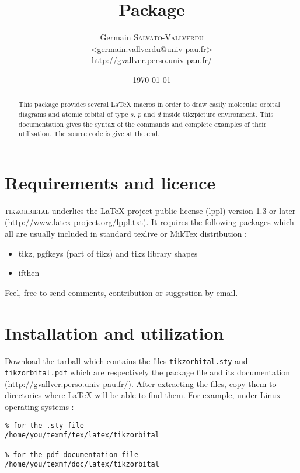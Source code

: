 \documentclass[10pt]{article}
\title{\package Package}
\author{Germain \textsc{Salvato-Vallverdu} \\ \url{<germain.vallverdu@univ-pau.fr>}\\\url{http://gvallver.perso.univ-pau.fr/}}
\date{\today}
\newcommand{\package}{\textsc{\sffamily\color{blue!50!black}tikzorbiltal}\xspace}
\begin{document}

\maketitle

\begin{abstract}
    This package provides several \LaTeX{} macros in order to draw easily molecular orbital diagrams and atomic orbital of type $s$, $p$ and $d$ inside tikzpicture environment. This documentation gives the syntax of the commands and complete examples of their utilization. The source code is give at the end.
\end{abstract}

{
    \singlespacing
    \tableofcontents
}

\section{Requirements and licence}

\package underlies the \LaTeX{} project public license (lppl) version 1.3 or later (\url{http://www.latex-project.org/lppl.txt}). It requires the following packages which all are usually included in standard texlive or MikTex distribution :

\begin{itemize}
    \item tikz, pgfkeys (part of tikz) and tikz library shapes
    \item ifthen
\end{itemize}

Feel, free to send comments, contribution or suggestion by email.

\section{Installation and utilization}

Download the tarball which contains the files \verb!tikzorbital.sty! and \verb!tikzorbital.pdf! which are respectively the package file and its documentation (\url{http://gvallver.perso.univ-pau.fr/}). After extracting the files, copy them to directories where \LaTeX{} will be able to find them. For example, under Linux operating systems :

\begin{lstlisting}
% for the .sty file
/home/you/texmf/tex/latex/tikzorbital

% for the pdf documentation file
/home/you/texmf/doc/latex/tikzorbital
\end{lstlisting}
\end{document}
